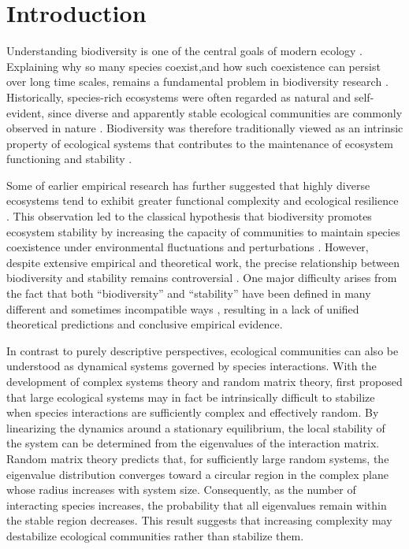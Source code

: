 \section{Introduction}

Understanding biodiversity is one of the central goals 
of modern ecology \citep{pimm_complexity_1984,mccann_diversitystability_2000,sutherland_identification_2013}. Explaining why so many species coexist,and how such coexistence can persist over long time scales, remains a fundamental problem in biodiversity research \citep{may_theoretical_2007}. Historically, species-rich ecosystems were often regarded as natural and self-evident, since diverse and apparently stable ecological communities are commonly observed in nature \citep{mccann_diversitystability_2000}. Biodiversity was therefore traditionally viewed as an intrinsic property of ecological systems that contributes to the maintenance of ecosystem functioning and stability \citep{clements_nature_1936}.

Some of earlier empirical research has further suggested that highly diverse ecosystems tend to exhibit greater functional complexity and ecological resilience \citep{pimentel_animal_1961,hairston_relationship_1968}. This observation led to the classical hypothesis that biodiversity promotes ecosystem stability by increasing the capacity of communities to maintain species coexistence under environmental fluctuations and perturbations \citep{elton_ecology_1977,pimm_complexity_1984}. 
However, despite extensive empirical and theoretical work, the precise relationship between biodiversity and stability remains controversial \citep{hooper_effects_2005}. One major difficulty arises from the fact that both ``biodiversity'' and ``stability'' have been defined in many different and sometimes incompatible ways \citep{grimm_babel_1997, dominguez-garcia_unveiling_2019}, resulting in a lack of unified theoretical predictions and conclusive empirical evidence.

In contrast to purely descriptive perspectives, ecological communities can also be understood as dynamical systems governed by species interactions. With the development of complex systems theory and random matrix theory, \citet{may_will_1972} first proposed that large ecological systems may in fact be intrinsically difficult to stabilize when species interactions are sufficiently complex and effectively random. By linearizing the dynamics around a stationary equilibrium, the local stability of the system can be determined from the eigenvalues of the interaction matrix. Random matrix theory \citep{pastur_spectrum_1972,tao_random_2010} predicts that, for sufficiently large random systems, the eigenvalue distribution converges toward a circular region in the complex plane whose radius increases with system size. Consequently, as the number of interacting species increases, the probability that all eigenvalues remain within the stable region decreases. This result suggests that increasing complexity may destabilize ecological communities rather than stabilize them. 

